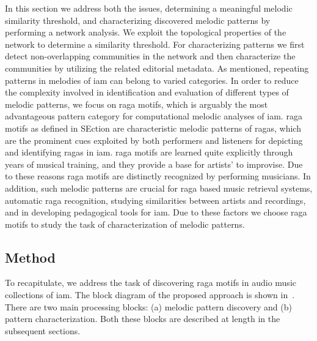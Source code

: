 In this section we address both the issues, determining a meaningful melodic similarity threshold, and characterizing discovered melodic patterns by performing a network analysis. We exploit the topological properties of the network to determine a similarity threshold. For characterizing patterns we first detect non-overlapping communities in the network and then characterize the communities by utilizing the related editorial metadata. As mentioned, repeating patterns in melodies of \gls{iam} can belong to varied categories. In order to reduce the complexity involved in identification and evaluation of different types of melodic patterns, we focus on \gls{raga} motifs, which is arguably the most advantageous pattern category for computational melodic analyses of \gls{iam}. \Gls{raga} motifs as defined in SEction  are characteristic melodic patterns of \glspl{raga}, which are the prominent cues exploited by both performers and listeners for depicting and identifying \glspl{raga} in \gls{iam}. \Gls{raga} motifs are learned quite explicitly through years of musical training, and they provide a base for artists' to improvise. Due to these reasons \gls{raga} motifs are distinctly recognized by performing musicians. In addition, such melodic patterns are crucial for \gls{raga} based music retrieval systems, automatic \gls{raga} recognition, studying similarities between artists and recordings, and in developing pedagogical tools for \gls{iam}. Due to these factors we choose \gls{raga} motifs to study the task of characterization of melodic patterns.  



\subsection{Method}

To recapitulate, we address the task of discovering \gls{raga} motifs in audio music collections of \gls{iam}. The block diagram of the proposed approach is shown in~. There are two main processing blocks: (a) melodic pattern discovery and (b) pattern characterization. Both these blocks are described at length in the subsequent sections.


